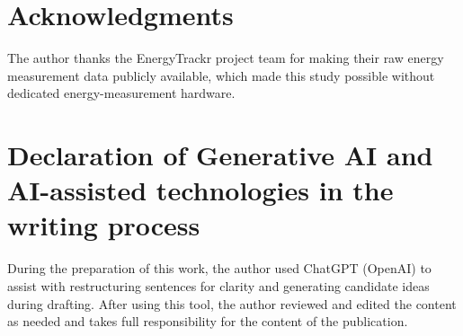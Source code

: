 \documentclass[preprint,12pt]{elsarticle}
\begin{document}
\section*{Acknowledgments}
The author thanks the EnergyTrackr project team for making their raw energy measurement data publicly available, which made this study possible without dedicated energy-measurement hardware.

\section*{Declaration of Generative AI and AI-assisted technologies in the writing process}
During the preparation of this work, the author used ChatGPT (OpenAI) to assist with restructuring sentences for clarity and generating candidate ideas during drafting. After using this tool, the author reviewed and edited the content as needed and takes full responsibility for the content of the publication.



\end{document}
